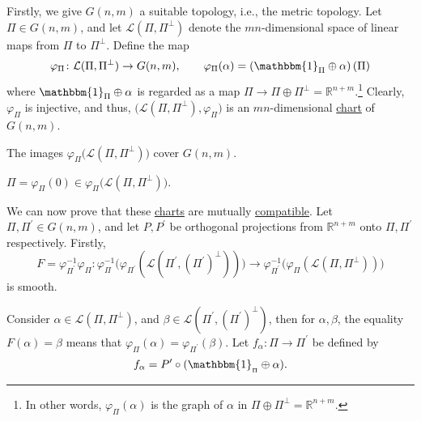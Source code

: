 Firstly, we give \(G(n, m)\) a suitable topology, i.e., the metric topology. Let \(\Pi \in G(n, m)\), and let \(\mathcal{L} (\Pi , \Pi ^{\perp})\) denote the \(mn\)-dimensional space of linear maps from \(\Pi\) to \(\Pi ^{\perp} \). Define the map
\[
	\varphi _\Pi \colon \mathcal{L} (\Pi , \Pi ^{\perp} ) \to G(n, m),\qquad
	\varphi _\Pi (\alpha ) = \left( \mathbbm{1}_{\Pi } \oplus \alpha  \right) (\Pi )
\]
where \(\mathbbm{1}_{\Pi }\oplus \alpha  \) is regarded as a map \(\Pi \to \Pi \oplus \Pi ^{\perp} = \mathbb{R} ^{n+m}\).\footnote{In other words, \(\varphi _\Pi (\alpha )\) is the graph of \(\alpha \) in \(\Pi \oplus \Pi ^{\perp} = \mathbb{R} ^{n+m}\).} Clearly, \(\varphi _\Pi \) is injective, and thus, \(\big(\mathcal{L} (\Pi , \Pi ^{\perp} ), \varphi _\Pi \big)\) is an \(mn\)-dimensional \hyperref[def:coordinate-chart]{chart} of \(G(n, m)\).

\begin{remark}
	The images \(\varphi _\Pi \big(\mathcal{L} (\Pi , \Pi ^{\perp} )\big)\) cover \(G(n, m)\).
\end{remark}

\begin{eg}
	\(\Pi = \varphi _\Pi (0)\in \varphi _\Pi \big(\mathcal{L} (\Pi , \Pi ^{\perp} )\big)\).
\end{eg}

We can now prove that these \hyperref[def:coordinate-chart]{charts} are mutually \hyperref[not:smoothly-compatible]{compatible}. Let \(\Pi , \Pi ^\prime \in G(n, m)\), and let \(P, P^\prime \) be orthogonal projections from \(\mathbb{R} ^{n+m}\) onto \(\Pi , \Pi ^\prime \) respectively. Firstly,
\[
	F = \varphi _{\Pi ^\prime }^{-1} \varphi _\Pi \colon \varphi _\Pi ^{-1} \big(\varphi _{\Pi ^\prime }(\mathcal{L} (\Pi ^\prime , (\Pi ^\prime )^{\perp} ))\big) \to  \varphi _{\Pi ^\prime }^{-1} \big(\varphi _\Pi (\mathcal{L} (\Pi , \Pi ^{\perp} ))\big)
\]
is smooth.

\begin{center}
\end{center}

Consider \(\alpha \in \mathcal{L} (\Pi ,\Pi ^{\perp} )\), and \(\beta \in \mathcal{L} (\Pi ^\prime , (\Pi ^\prime )^{\perp} )\), then for \(\alpha , \beta \), the equality \(F(\alpha ) = \beta\) means that \(\varphi _\Pi (\alpha ) = \varphi _{\Pi ^\prime }(\beta )\). Let \(f_\alpha \colon \Pi \to \Pi ^\prime \) be defined by
\[
	f_\alpha = P^\prime \circ (\mathbbm{1}_{_\Pi }\oplus \alpha ).
\]

